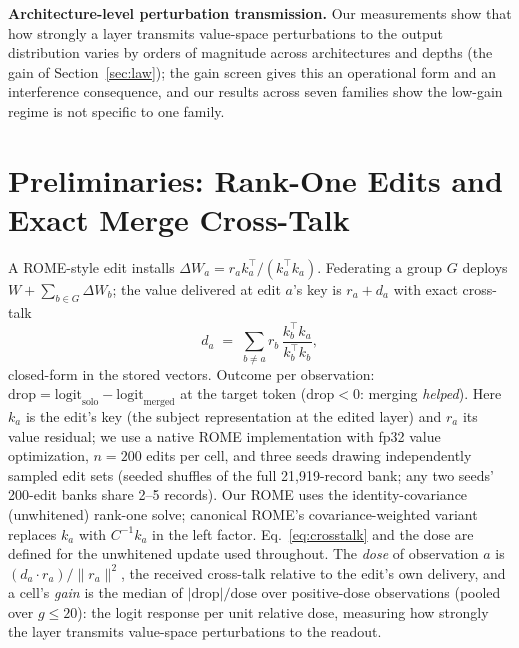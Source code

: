\documentclass[preprint,12pt]{elsarticle}
\theoremstyle{definition}
\begin{document}
\textbf{Architecture-level perturbation transmission.} Our measurements show that how
strongly a layer transmits value-space perturbations to the output distribution varies
by orders of magnitude across architectures and depths (the gain of
Section~\ref{sec:law}); the gain screen gives this an operational form and an
interference consequence, and our results across seven families show the low-gain
regime is not specific to one family.

\section{Preliminaries: Rank-One Edits and Exact Merge Cross-Talk}\label{sec:prelim}
A ROME-style edit installs $\Delta W_a = r_a k_a^{\top}/(k_a^{\top}k_a)$. Federating a
group $G$ deploys $W + \sum_{b\in G}\Delta W_b$; the value delivered at edit $a$'s key
is $r_a + d_a$ with exact cross-talk
\begin{equation}
d_a \;=\; \sum_{b\neq a} r_b\,\frac{k_b^{\top}k_a}{k_b^{\top}k_b},
\label{eq:crosstalk}
\end{equation}
closed-form in the stored vectors. Outcome per observation:
$\mathrm{drop}=\mathrm{logit}_{\mathrm{solo}}-\mathrm{logit}_{\mathrm{merged}}$ at the
target token ($\mathrm{drop}<0$: merging \emph{helped}). Here $k_a$ is the edit's key (the subject representation at the edited layer) and $r_a$ its
value residual; we use a native ROME implementation with fp32 value optimization, $n=200$
edits per cell, and three seeds drawing independently sampled edit sets (seeded
shuffles of the full 21{,}919-record bank; any two seeds' 200-edit banks share 2--5
records). Our ROME uses the identity-covariance (unwhitened) rank-one solve;
canonical ROME's covariance-weighted variant replaces $k_a$ with $C^{-1}k_a$ in
the left factor. Eq.~\ref{eq:crosstalk} and the dose are defined for the
unwhitened update used throughout.
The \emph{dose} of observation
$a$ is $(d_a\!\cdot\!r_a)/\lVert r_a\rVert^2$, the received cross-talk relative to the
edit's own delivery, and a cell's \emph{gain} is the median of $|\mathrm{drop}|/\text{dose}$
over positive-dose observations (pooled over $g\leq20$): the logit response per unit
relative dose, measuring how strongly the layer transmits value-space perturbations to the
readout.
\end{document}
